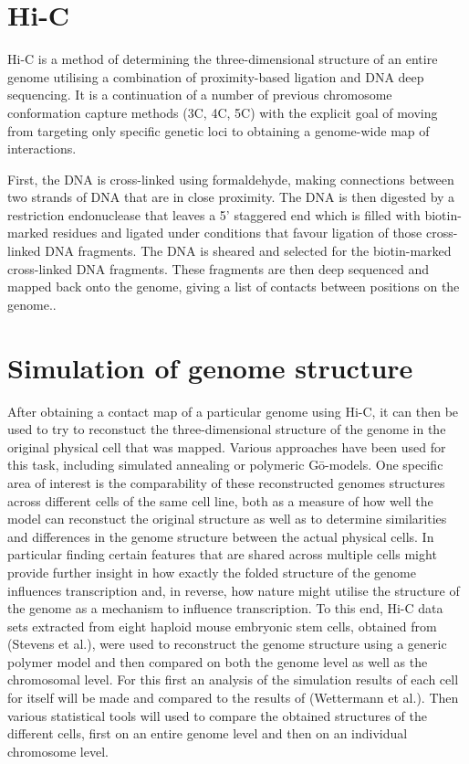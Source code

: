 \documentclass[a4paper,11pt,oneside,final,english,toc=bib,draft]{scrbook}
\begin{document}

\section{Hi-C} %
\label{sec:hi_c}

Hi-C is a method of determining the three-dimensional structure of an entire genome utilising a combination of proximity-based ligation and DNA deep sequencing. It is a continuation of a number of previous chromosome conformation capture methods (3C, 4C, 5C) with the explicit goal of moving from targeting only specific genetic loci to obtaining a genome-wide map of interactions.

First, the DNA is cross-linked using formaldehyde, making connections between two strands of DNA that are in close proximity. The DNA is then digested by a restriction endonuclease that leaves a 5' staggered end which is filled with biotin-marked residues and ligated under conditions that favour ligation of those cross-linked DNA fragments. The DNA is sheared and selected for the biotin-marked cross-linked DNA fragments. These fragments are then deep sequenced and mapped back onto the genome, giving a list of contacts between positions on the genome.\cite{lieberman-aiden_comprehensive_2009}.


\section{Simulation of genome structure} %
\label{sec:simulation_of_genome_structure}

After obtaining a contact map of a particular genome using Hi-C, it can then be used to try to reconstuct the three-dimensional structure of the genome in the original physical cell that was mapped. Various approaches have been used for this task, including simulated annealing\cite{stevens_3d_2017} or polymeric Gō-models\cite{wettermann_minimal_2020}. One specific area of interest is the comparability of these reconstructed genomes structures across different cells of the same cell line, both as a measure of how well the model can reconstuct the original structure as well as to determine similarities and differences in the genome structure between the actual physical cells. In particular finding certain features that are shared across multiple cells might provide further insight in how exactly the folded structure of the genome influences transcription and, in reverse, how nature might utilise the structure of the genome as a mechanism to influence transcription. To this end, Hi-C data sets extracted from eight haploid mouse embryonic stem cells, obtained from (Stevens et al.\cite{stevens_3d_2017}), were used to reconstruct the genome structure using a generic polymer model and then compared on both the genome level as well as the chromosomal level. For this first an analysis of the simulation results of each cell for itself will be made and compared to the results of (Wettermann et al.\cite{wettermann_minimal_2020}). Then various statistical tools will used to compare the obtained structures of the different cells, first on an entire genome level and then on an individual chromosome level.
\end{document}
